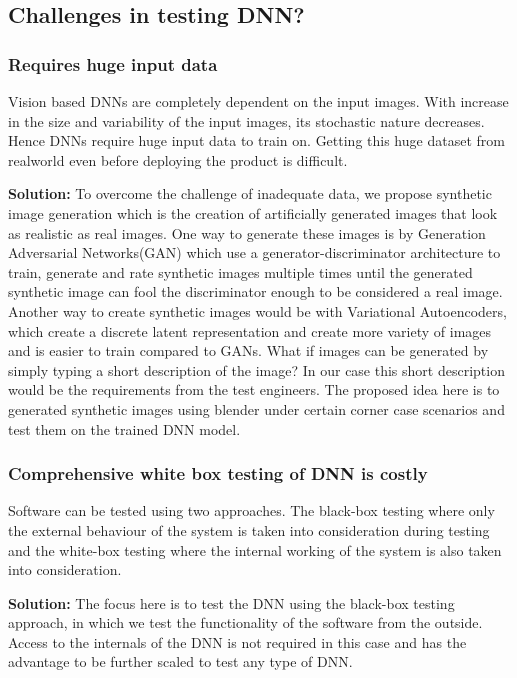 \documentclass[rnd]{mas_proposal}
\begin{document}
\subsection{Challenges in testing DNN?}

\subsubsection{Requires huge input data}
    
Vision based DNNs are completely dependent on the input images. With increase in the size and variability of the input images, its stochastic nature decreases. Hence DNNs require huge input data to train on\cite{ChallengesML}. Getting this huge dataset from realworld even before deploying the product is difficult.

\textbf{Solution:} To overcome the challenge of inadequate data, we propose synthetic image generation which is the creation of artificially generated images that look as realistic as real images. One way to generate these images is by Generation Adversarial Networks(GAN) \cite{9780790} which use a generator-discriminator architecture to train, generate and rate synthetic images multiple times until the generated synthetic image can fool the discriminator enough to be considered a real image. Another way to create synthetic images would be with Variational Autoencoders\cite{9780790}, which create a discrete latent representation and create more variety of images and is easier to train compared to GANs. What if images can be generated by simply typing a short description of the image? In our case this short description would be the requirements from the test engineers. The proposed idea here is to generated synthetic images using blender under certain corner case scenarios and test them on  the trained DNN model. 
    
\subsubsection{Comprehensive white box testing of DNN is costly}
    
Software can be tested using two approaches\cite{verification}. The black-box testing where only the external behaviour of the system is taken into consideration during testing and the white-box testing where the internal working of the system is also taken into consideration.

\textbf{Solution:} The focus here is to test the DNN using the black-box testing approach, in which we test the functionality of the software from the outside. Access to the internals of the DNN is not required in this case and has the advantage to be further scaled to test any type of DNN.
\end{document}
